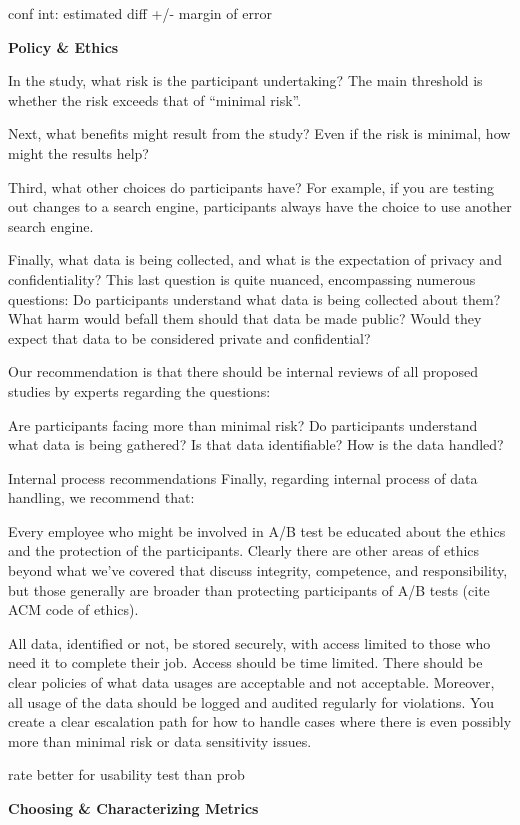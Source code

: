 \documentclass[]{book}
\begin{document}
conf int: estimated diff +/- margin of error

\textbf{Policy \& Ethics}

In the study, what risk is the participant undertaking? The main
threshold is whether the risk exceeds that of ``minimal risk''.

Next, what benefits might result from the study? Even if the risk is
minimal, how might the results help?

Third, what other choices do participants have? For example, if you are
testing out changes to a search engine, participants always have the
choice to use another search engine.

Finally, what data is being collected, and what is the expectation of
privacy and confidentiality? This last question is quite nuanced,
encompassing numerous questions: Do participants understand what data is
being collected about them? What harm would befall them should that data
be made public? Would they expect that data to be considered private and
confidential?

Our recommendation is that there should be internal reviews of all
proposed studies by experts regarding the questions:

Are participants facing more than minimal risk? Do participants
understand what data is being gathered? Is that data identifiable? How
is the data handled?

Internal process recommendations Finally, regarding internal process of
data handling, we recommend that:

Every employee who might be involved in A/B test be educated about the
ethics and the protection of the participants. Clearly there are other
areas of ethics beyond what we've covered that discuss integrity,
competence, and responsibility, but those generally are broader than
protecting participants of A/B tests (cite ACM code of ethics).

All data, identified or not, be stored securely, with access limited to
those who need it to complete their job. Access should be time limited.
There should be clear policies of what data usages are acceptable and
not acceptable. Moreover, all usage of the data should be logged and
audited regularly for violations. You create a clear escalation path for
how to handle cases where there is even possibly more than minimal risk
or data sensitivity issues.

rate better for usability test than prob

\textbf{Choosing \& Characterizing Metrics}
\end{document}
